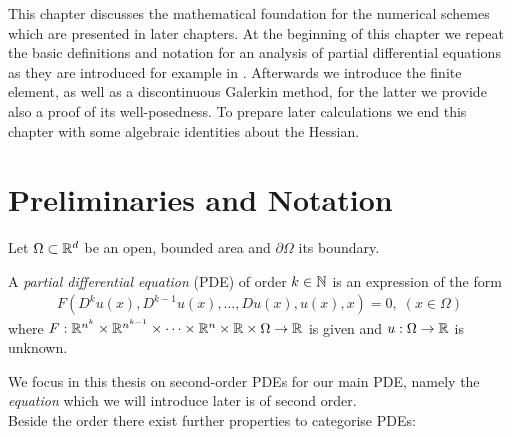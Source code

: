 This chapter discusses the mathematical foundation for the numerical schemes which are presented in later chapters.
At the beginning of this chapter we repeat the basic definitions and notation for an analysis of partial differential equations as they are introduced for example in \cite[Introduction]{Evans1998}. Afterwards we introduce the finite element, as well as a discontinuous Galerkin method, for the latter we provide also a proof of its well-posedness. To prepare later calculations we end this chapter with some algebraic identities about the Hessian.

\section{ Preliminaries and Notation}
Let $\Omega \subset \mathbb{R}^d $ be an open, bounded area and $\partial \Omega$ its boundary.
\begin{definition}
 A \emph{partial differential equation} (PDE) of order $k\in \mathbb{N}$ is an expression of the form
\begin{align}
	F(D^k u(x), D^{k-1}u(x), \dots, Du(x), u(x), x) = 0, \; (x \in \Omega)\label{eq:general PDE}
\end{align}
where $F:\mathbb{R}^{n^k} \times \mathbb{R}^{n^{k-1}} \times \dots \times \mathbb{R}^n \times \mathbb{R} \times \Omega \rightarrow \mathbb{R} $ is given and $u:\Omega \rightarrow \mathbb{R}$ is unknown.
\end{definition}
We focus in this thesis on second-order PDEs for our main PDE, namely the \emph{\MA equation} which we will introduce later is of second order. 
\\Beside the order there exist further properties to categorise PDEs:
